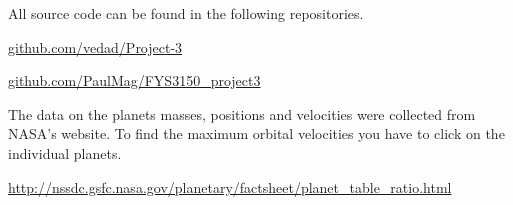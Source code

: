 All source code can be found in the following repositories.

\url{github.com/vedad/Project-3}

\url{github.com/PaulMag/FYS3150_project3}

The data on the planets masses, positions and velocities were collected from NASA's website. To find the maximum orbital velocities you have to click on the individual planets.

\url{http://nssdc.gsfc.nasa.gov/planetary/factsheet/planet_table_ratio.html}

